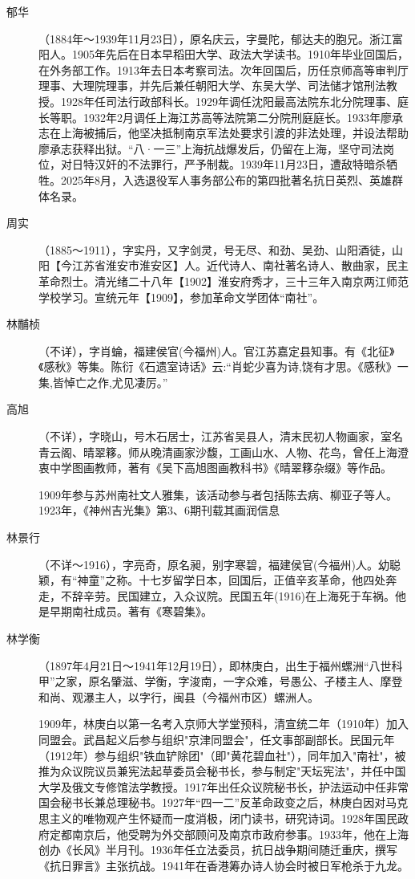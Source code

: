 \begin{description}
  \item[郁华] （1884年～1939年11月23日），原名庆云，字曼陀，郁达夫的胞兄。浙江富阳人。1905年先后在日本早稻田大学、政法大学读书。1910年毕业回国后，在外务部工作。1913年去日本考察司法。次年回国后，历任京师高等审判厅理事、大理院理事，并先后兼任朝阳大学、东吴大学、司法储才馆刑法教授。1928年任司法行政部科长。1929年调任沈阳最高法院东北分院理事、庭长等职。1932年2月调任上海江苏高等法院第二分院刑庭庭长。1933年廖承志在上海被捕后，他坚决抵制南京军法处要求引渡的非法处理，并设法帮助廖承志获释出狱。“八·一三”上海抗战爆发后，仍留在上海，坚守司法岗位，对日特汉奸的不法罪行，严予制裁。1939年11月23日，遭敌特暗杀牺牲。2025年8月，入选退役军人事务部公布的第四批著名抗日英烈、英雄群体名录。
  \item[周实] （1885～1911），字实丹，又字剑灵，号无尽、和劲、吴劲、山阳酒徒，山阳【今江苏省淮安市淮安区】人。近代诗人、南社著名诗人、散曲家，民主革命烈士。清光绪二十八年【1902】淮安府秀才，三十三年入南京两江师范学校学习。宣统元年【1909】，参加革命文学团体“南社”。
  \item[林黼桢] （不详），字肖蜦，福建侯官(今福州)人。官江苏嘉定县知事。有《北征》《感秋》等集。陈衍《石遗室诗话》云:“肖蛇少喜为诗,饶有才思。《感秋》一集,皆悼亡之作,尤见凄厉。”
  \item[高旭] （不详），字晓山，号木石居士，江苏省吴县人，清末民初人物画家，室名青云阁、晴翠簃。师从晚清画家沙馥，工画山水、人物、花鸟，曾任上海澄衷中学图画教师，著有《吴下高旭图画教科书》《晴翠簃杂缀》等作品。\par
        1909年参与苏州南社文人雅集，该活动参与者包括陈去病、柳亚子等人。1923年，《神州吉光集》第3、6期刊载其画润信息
  \item[林景行] （不详～1916），字亮奇，原名昶，别字寒碧，福建侯官(今福州)人。幼聪颖，有“神童”之称。十七岁留学日本，回国后，正值辛亥革命，他四处奔走，不辞辛劳。民国建立，入众议院。民国五年(1916)在上海死于车祸。他是早期南社成员。著有《寒碧集》。
  \item[林学衡] （1897年4月21日～1941年12月19日），即林庚白，出生于福州螺洲“八世科甲”之家，原名肇滋、学衡，字浚南，一字众难，号愚公、孑楼主人、摩登和尚、观瀑主人，以字行，闽县（今福州市区）螺洲人。\par
        1909年，林庚白以第一名考入京师大学堂预科，清宣统二年（1910年）加入同盟会。武昌起义后参与组织"京津同盟会"，任文事部副部长。民国元年（1912年）参与组织"铁血铲除团"（即"黄花碧血社"），同年加入"南社"，被推为众议院议员兼宪法起草委员会秘书长，参与制定"天坛宪法"，并任中国大学及俄文专修馆法学教授。1917年出任众议院秘书长，护法运动中任非常国会秘书长兼总理秘书。1927年“四一二”反革命政变之后，林庚白因对马克思主义的唯物观产生怀疑而一度消极，闭门读书，研究诗词。1928年国民政府定都南京后，他受聘为外交部顾问及南京市政府参事。1933年，他在上海创办《长风》半月刊。1936年任立法委员，抗日战争期间随迁重庆，撰写《抗日罪言》主张抗战。1941年在香港筹办诗人协会时被日军枪杀于九龙。\par

\end{description}
